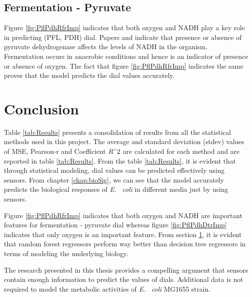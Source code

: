 \documentclass[12pt,chapterheads]{ucsd}
\begin{document}
\section{Fermentation - Pyruvate}\label{sec:pflpdhImp}
Figure \ref{fig:PflPdhRfrImp} indicates that both oxygen and NADH play a key role in predicting (PFL, PDH) dial. Papers \cite{pmid2655695} and \cite{pmid22343352} indicate that presence or absence of pyruvate dehydrogenase affects the levels of NADH in the organism. Fermentation occurs in anaerobic conditions and hence is an indicator of presence or absence of oxygen. The fact that figure \ref{fig:PflPdhRfrImp} indicates the same proves that the model predicts the dial values accurately.


\chapter{Conclusion}
Table \ref{tab:Results} presents a consolidation of results from all the statistical methods used in this project. The average and standard deviation (stdev) values of MSE, Pearson-r and Coefficient $R\string^2$ are calculated for each method and are reported in table \ref{tab:Results}. From the table \ref{tab:Results}, it is evident that through statistical modeling, dial values can be predicted effectively using sensors. From chapter \ref{chap:bioSig}, we can see that the model accurately predicts the biological responses of \textit{E. ~coli} in different media just by using sensors. 

Figure \ref{fig:PflPdhRfrImp} indicates that both oxygen and NADH are important features for fermentation - pyruvate dial whereas figure \ref{fig:PflPdhDtrImp} indicates that only oxygen is an important feature. From section \ref{sec:pflpdhImp}, it is evident that random forest regressors perform way better than decision tree regressors in terms of modeling the underlying biology. 

The research presented in this thesis provides a compelling argument that sensors contain enough information to predict the values of dials. Additional data is not required to model the metabolic activities of \textit{E. ~coli} MG1655 strain.
\end{document}
